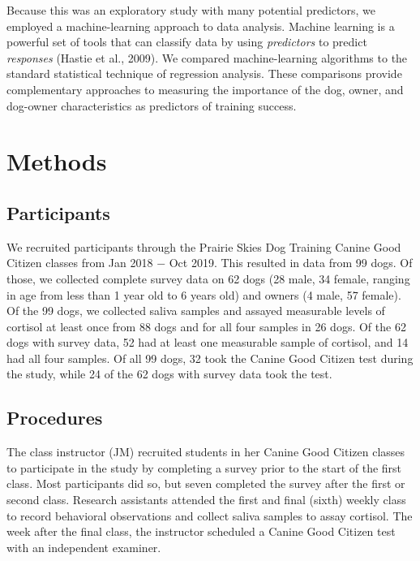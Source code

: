 \documentclass[
  english,
  ,pub,floatsintext]{apa6}
\begin{document}
Because this was an exploratory study with many potential predictors, we employed a machine-learning approach to data analysis. Machine learning is a powerful set of tools that can classify data by using \emph{predictors} to predict \emph{responses} (Hastie et al., 2009). We compared machine-learning algorithms to the standard statistical technique of regression analysis. These comparisons provide complementary approaches to measuring the importance of the dog, owner, and dog-owner characteristics as predictors of training success.

\hypertarget{methods}{%
\section{Methods}\label{methods}}

\hypertarget{participants}{%
\subsection{Participants}\label{participants}}

We recruited participants through the Prairie Skies Dog Training Canine Good Citizen classes from Jan 2018 \(-\) Oct 2019. This resulted in data from 99 dogs. Of those, we collected complete survey data on 62 dogs (28 male, 34 female, ranging in age from less than 1 year old to 6 years old) and owners (4 male, 57 female). Of the 99 dogs, we collected saliva samples and assayed measurable levels of cortisol at least once from 88 dogs and for all four samples in 26 dogs. Of the 62 dogs with survey data, 52 had at least one measurable sample of cortisol, and 14 had all four samples. Of all 99 dogs, 32 took the Canine Good Citizen test during the study, while 24 of the 62 dogs with survey data took the test.

\hypertarget{procedures}{%
\subsection{Procedures}\label{procedures}}

The class instructor (JM) recruited students in her Canine Good Citizen classes to participate in the study by completing a survey prior to the start of the first class. Most participants did so, but seven completed the survey after the first or second class. Research assistants attended the first and final (sixth) weekly class to record behavioral observations and collect saliva samples to assay cortisol. The week after the final class, the instructor scheduled a Canine Good Citizen test with an independent examiner.
\end{document}
